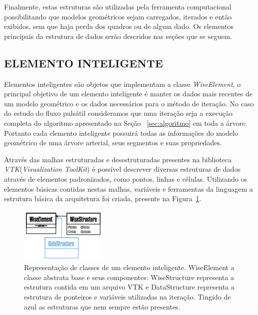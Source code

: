 \documentclass[
        english,			
        brazil			        %
        ,<...>]{abntbibufjf}
\begin{document}
Finalmente, estas estruturas são utilizadas pela ferramenta computacional possibilitando que modelos geométricos sejam carregados, iterados e então exibidos, sem que haja perda dos quadros ou de algum dado. Os elementos principais da estrutura de dados serão descridos nas seções que se seguem.

\subsection{ELEMENTO INTELIGENTE}\label{sec:elemento_inteligente}

Elementos inteligentes são objetos que implementam a classe \textit{WiseElement}, o principal objetivo de um elemento inteligente é manter os dados mais recentes de um modelo geométrico e os dados necessários para o método de iteração. No caso do estudo do fluxo pulsátil consideramos que uma iteração seja a execução completa do algoritmo apresentado na Seção~ \ref{sec:algoritmo} em toda a árvore. Portanto cada elemento inteligente possuirá todas as informações do modelo geométrico de uma árvore arterial, seus segmentos e suas propriedades.

Através das malhas estruturadas e desestruturadas presentes na biblioteca \textit{VTK}(\textit{Visualization ToolKit}) é possível descrever diversas estruturas de dados através de elementos padronizados, como pontos, linhas e células. Utilizando os elementos básicas contidas nestas malhas, variáveis e ferramentas da linguagem a estrutura básica da arquitetura foi criada, presente na Figura~\ref{fig2:wiselement}.

\begin{figure}[!htbp]
	\centering
	\includegraphics[scale=1]{Figures/WiseElement.png}
	\caption{Representação de classes de um elemento inteligente. WiseElement a classe abstrata base e seus componentes: WiseStructure representa a estrutura contida em um arquivo VTK e DataStructure representa a estrutura de ponteiros e variáveis utilizadas na iteração. Tingido de azul as estruturas que nem sempre estão presentes.}
	\label{fig2:wiselement}
\end{figure}
\end{document}

